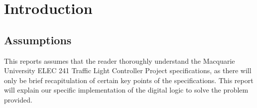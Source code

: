 \chapter{Introduction}
\section{Assumptions}
This reports assumes that the reader thoroughly understand the Macquarie
University ELEC 241 Traffic Light Controller Project specifications, as there
will only be brief recapitulation of certain key points of the specifications.
This report will explain our specific implementation of the digital logic to
solve the problem provided.